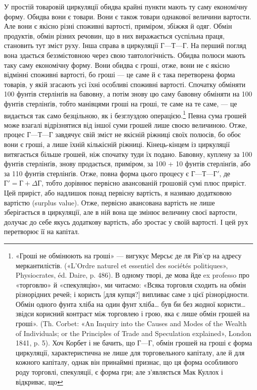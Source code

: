 У простій товаровій циркуляції обидва крайні пункти мають
ту саму економічну форму. Обидва вони є товари. Вони є також
товари однакової величини вартости. Але вони є якісно різні
споживні вартості, приміром, збіжжя й одяг. Обмін продуктів,
обмін різних речовин, що в них виражається суспільна праця,
становить тут зміст руху. Інша справа в циркуляції $Г — Т — Г$.
На перший погляд вона здається беззмістовною через свою тавтологічність.
Обидва полюси мають таку саму економічну форму.
Вони обидва є гроші, отже, вони не є якісно відмінні споживні
вартості, бо гроші — це саме й є така перетворена форма товарів,
у якій згасають усі їхні особливі споживні вартості. Спочатку
обміняти 100 фунтів стерлінґів на бавовну, а потім знову цю саму
бавовну обміняти на 100 фунтів стерлінґів, тобто манівцями
гроші на гроші, те саме на те саме, — це видається так само безцільною,
як і безглуздою операцією.\footnote{
«Гроші не обмінюють на гроші» — вигукує Мерсьє де ля Рів’єр
на адресу меркантилістів. («L’Ordre naturel et essentiel des sociétés politiques»,
Physiocrates, éd. Daire, p. 486). В одному творі, де мова йде
ex professo про «торговлю» й «спекуляцію», ми читаємо: «Всяка торговля
сходить на обмін різнорідних речей; і користь [для купця?] випливає
саме з цієї різнорідности. Обмін одного фунта хліба на один фунт хліба\dots{}
був би без жодної користи\dots{} звідси корисний контраст між торговлею
і грою, яка є лише обмін грошей на гроші». (Th. Corbet: «An Inquiry
into the Causes and Modes of the Wealth of Individuals; or the Principles
of Trade and Speculation explained», London 1841, p. 5). Хоч Корбет і не
бачить, що $Г — Г$, обмін грошей на гроші є форма циркуляції, характеристична
не лише для торговельного капіталу, але й для кожного капіталу,
однак він принаймні признає, що ця форма особливого роду торговлі,
спекуляції, є форма гри; але з’являється Мак Куллох і відкриває, що
} Певна сума грошей може
взагалі відрізнятися від іншої суми грошей лише своєю величиною.
Отже, процес $Г — Т — Г$ завдячує свій зміст не якісній
ріжниці своїх полюсів, бо обоє вони є гроші, а лише їхній кількісній
ріжниці. Кінець-кінцем із циркуляції витягається більше
грошей, ніж спочатку туди їх подано. Бавовну, куплену за 100
фунтів стерлінґів, знову продається, приміром, за 100 + 10 фунтів
стерлінґів, або за 110 фунтів стерлінґів. Отже, повна форма
цього процесу є $Г — Т — Г'$, де $Г' = Г + ΔГ$, тобто дорівнює
первісно авансованій грошовій сумі плюс приріст. Цей приріст,
або надлишок понад первісну вартість, я називаю додатковою
вартістю (surplus value). Отже, первісно авансована вартість не
лише зберігається в циркуляції, але в ній вона ще змінює величину
своєї вартости, долучає до себе якусь додаткову вартість,
або зростає у своїй вартості. І цей рух перетворює її на
капітал.

